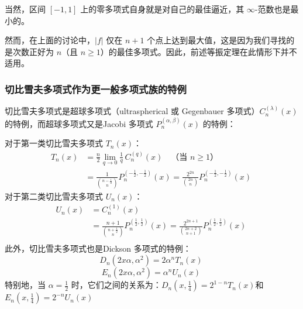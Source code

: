 当然，区间 $[-1,1]$ 上的零多项式自身就是对自己的最佳逼近，其 $\infty$-范数也是最小的。

然而，在上面的讨论中，$|f|$ 仅在 $n + 1$ 个点上达到最大值，这是因为我们寻找的是次数正好为 $n$（且 $n \geq 1$）的最佳多项式。因此，前述等振定理在此情形下并不适用。
\subsubsection{切比雪夫多项式作为更一般多项式族的特例}
切比雪夫多项式是超球多项式（ultraspherical 或 Gegenbauer 多项式）$C_n^{(\lambda)}(x)$ 的特例，而超球多项式又是Jacobi 多项式 $P_n^{(\alpha, \beta)}(x)$ 的特例：

对于第一类切比雪夫多项式 $T_n(x)$：
$$
\begin{aligned}
T_n(x) &= \frac{n}{2} \lim_{q \to 0} \frac{1}{q} \, C_n^{(q)}(x) \quad \text{（当 } n \geq 1\text{）}\\
&= \frac{1}{\binom{n - \frac{1}{2}}{n}} P_n^{(-\frac{1}{2}, -\frac{1}{2})}(x) = \frac{2^{2n}}{\binom{2n}{n}} P_n^{(-\frac{1}{2}, -\frac{1}{2})}(x)
\end{aligned}~
$$
对于第二类切比雪夫多项式 $U_n(x)$：
$$
\begin{aligned}
U_n(x) &= C_n^{(1)}(x)\\
 &= \frac{n+1}{\binom{n + \frac{1}{2}}{n}} P_n^{(\frac{1}{2}, \frac{1}{2})}(x) = \frac{2^{2n + 1}}{\binom{2n + 2}{n + 1}} P_n^{(\frac{1}{2}, \frac{1}{2})}(x)\\
\end{aligned}~
$$
此外，切比雪夫多项式也是Dickson 多项式的特例：
$$
D_n(2x\alpha, \alpha^2) = 2\alpha^n T_n(x)~
$$
$$
E_n(2x\alpha, \alpha^2) = \alpha^n U_n(x)~
$$
特别地，当 $\alpha = \frac{1}{2}$ 时，它们之间的关系为：$D_n(x, \tfrac{1}{4}) = 2^{1 - n} T_n(x)$和$E_n(x, \tfrac{1}{4}) = 2^{-n} U_n(x)$
